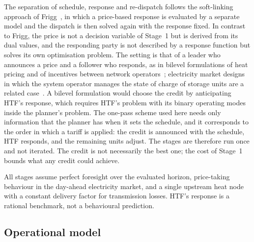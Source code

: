 The separation of schedule, response and re-dispatch follows the soft-linking approach of Frigg~\cite{schledorn2022a,schledorn2024frigg}, in which a price-based response is evaluated by a separate model and the dispatch is then solved again with the response fixed. In contrast to Frigg, the price is not a decision variable of Stage~1 but is derived from its dual values, and the responding party is not described by a response function but solves its own optimisation problem. The setting is that of a leader who announces a price and a follower who responds, as in bilevel formulations of heat pricing and of incentives between network operators~\cite{bai2022variable,zheng2021incentive}; electricity market designs in which the system operator manages the state of charge of storage units are a related case~\cite{fang2022efficient}. A bilevel formulation would choose the credit by anticipating HTF's response, which requires HTF's problem with its binary operating modes inside the planner's problem. The one-pass scheme used here needs only information that the planner has when it sets the schedule, and it corresponds to the order in which a tariff is applied: the credit is announced with the schedule, HTF responds, and the remaining units adjust. The stages are therefore run once and not iterated. The credit is not necessarily the best one; the cost of Stage~1 bounds what any credit could achieve.

All stages assume perfect foresight over the evaluated horizon, price-taking behaviour in the day-ahead electricity market, and a single upstream heat node with a constant delivery factor for transmission losses. HTF's response is a rational benchmark, not a behavioural prediction.

\subsection{Operational model}
\label{sec:model}

